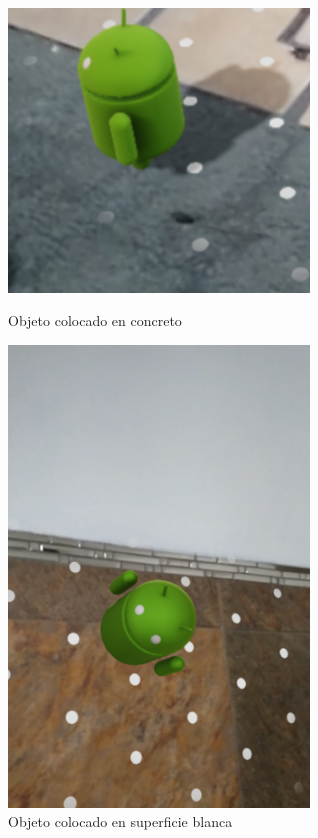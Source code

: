 \begin{figure}[!htbp]
	\begin{minipage}{0.48\textwidth}
		\centering
		\includegraphics[width=8cm]{desarrollo/secciones/pruebas/motog6/img/CONCRETO.png}
		\caption{Objeto colocado en concreto}
		\label{fig:motog6concreto}
	\end{minipage}\hfill
	\begin{minipage}{0.48\textwidth}
		\centering
		\includegraphics[width=8cm]{desarrollo/secciones/pruebas/motog6/img/SUPBLANCA.png}
		\caption{Objeto colocado en superficie blanca}
		\label{fig:motog6supblanca}
	\end{minipage}\hfill
\end{figure}

